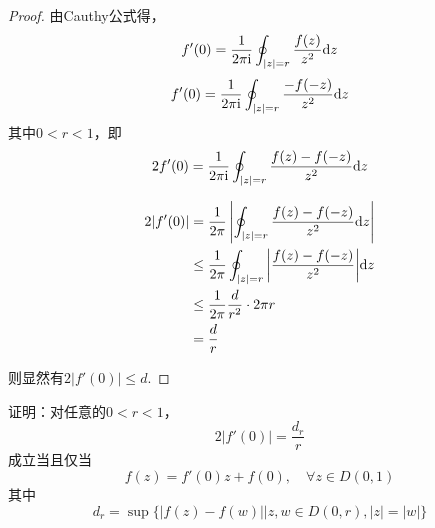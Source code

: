 \begin{proof}

    由\textup{Cauthy}公式得，
    $$f'(0) = \dfrac{1}{2\pi \mathrm{i}} \oint_{|z| = r}{\dfrac{f(z)}{z^2}}\mathrm{d} z$$
    $$f'(0) = \dfrac{1}{2\pi \mathrm{i}} \oint_{|z| = r}{\dfrac{-f(-z)}{z^2}}\mathrm{d} z$$
    其中$0 < r < 1$，即
    $$2f'(0) = \dfrac{1}{2\pi \mathrm{i}} \oint_{|z| = r}{\dfrac{f(z)-f(-z)}{z^2}}\mathrm{d} z$$

    \begin{align*}
        2|f'(0)| & = \dfrac{1}{2 \pi} \left| \oint_{|z| = r}{\dfrac{f(z)-f(-z)}{z^2}}\mathrm{d} z \right| \\
        & \leq \dfrac{1}{2 \pi} \oint_{|z|=r}{\left|\dfrac{f(z)-f(-z)}{z^2}\right|}\mathrm{d} z\\
        & \leq \dfrac{1}{2 \pi} \dfrac{d}{r^2} \cdot 2 \pi r\\
        & = \dfrac{d}{r}
    \end{align*}

    则显然有$2|f'(0)| \leq d$.

\end{proof}

\begin{theorem}\label{theorem:complex}

    证明：对任意的$0 < r < 1$，
    $$2|f'(0)| = \dfrac{d_r}{r}$$
    成立当且仅当
    $$f(z) = f'(0)z + f(0), \quad \forall z \in D(0,1)$$
    其中
    $$d_r = \sup\{|f(z) - f(w)|\big| z,w \in D(0,r), |z| = |w|\}$$
    
\end{theorem}

